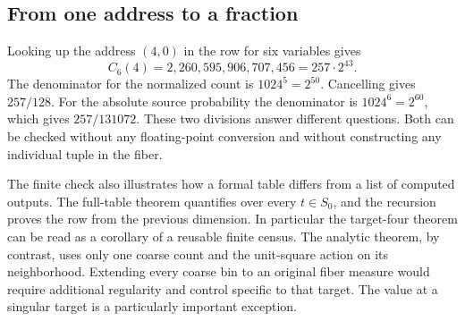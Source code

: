 \documentclass[12pt,letterpaper]{article}
\begin{document}
\subsection{From one address to a fraction}
Looking up the address $(4,0)$ in the row for six variables gives
\[
 C_6(4)=2{,}260{,}595{,}906{,}707{,}456=257\cdot2^{43}.
\]
The denominator for the normalized count is $1024^5=2^{50}$. Cancelling gives $257/128$. For the absolute source probability the denominator is $1024^6=2^{60}$, which gives $257/131072$. These two divisions answer different questions. Both can be checked without any floating-point conversion and without constructing any individual tuple in the fiber.
\par
The finite check also illustrates how a formal table differs from a list of computed outputs. The full-table theorem quantifies over every $t\in S_0$, and the recursion proves the row from the previous dimension. In particular the target-four theorem can be read as a corollary of a reusable finite census. The analytic theorem, by contrast, uses only one coarse count and the unit-square action on its neighborhood. Extending every coarse bin to an original fiber measure would require additional regularity and control specific to that target. The value at a singular target is a particularly important exception.
\end{document}
